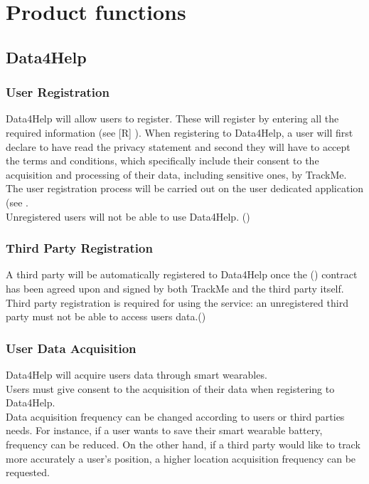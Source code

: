 \documentclass[../../rasd.tex]{subfiles}
\begin{document}
\section{Product functions}
			\subsection{Data4Help}
			
			\subsubsection{User Registration}
			Data4Help will allow users to register. These will register by entering all the required information (see [R] ). When registering to Data4Help, a user will first declare to have read the privacy statement and second they will have to accept the terms and conditions, which specifically include their consent to the acquisition and processing of their data, including sensitive ones, by TrackMe.\\
			The user registration process will be carried out on the user dedicated application (see .\\
			Unregistered users will not be able to use Data4Help. ()
			
			\subsubsection{Third Party Registration}
			A third party will be automatically registered to Data4Help once the () contract has been agreed upon and signed by both TrackMe and the third party itself.\\
			Third party registration is required for using the service: an unregistered third party must not be able to access users data.()
			
			\subsubsection{User Data Acquisition}
			Data4Help will acquire users data through smart wearables. \\
			Users must give consent to the acquisition of their data when registering to Data4Help.\\
			Data acquisition frequency can be changed according to users or third parties needs. For instance, if a user wants to save their smart wearable battery, frequency can be reduced. On the other hand, if a third party would like to track more accurately a user's position, a higher location acquisition frequency can be requested.	
\end{document}
